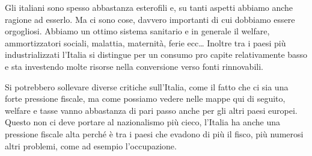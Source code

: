 \documentclass[12pt]{book} %
\begin{document}
Gli italiani sono spesso abbastanza esterofili e, su tanti aspetti abbiamo anche ragione ad esserlo. Ma ci sono cose, davvero
importanti di cui dobbiamo essere orgogliosi. Abbiamo un ottimo sistema sanitario e in generale il
welfare, ammortizzatori
sociali, malattia, maternità, ferie ecc… Inoltre tra i paesi più industrializzati l'Italia si distingue per un consumo pro capite relativamente basso e sta investendo molte risorse nella conversione verso fonti rinnovabili.

Si potrebbero sollevare diverse critiche sull'Italia, come il fatto che ci sia una forte pressione
fiscale, ma come possiamo vedere nelle mappe qui di seguito, welfare e tasse vanno abbastanza di pari passo anche per gli altri paesi europei. 
Questo non ci deve portare al nazionalismo più cieco, l'Italia ha anche una pressione fiscale alta perché è tra i paesi che evadono di più il fisco, più numerosi altri problemi, come ad esempio l'occupazione.
\end{document}
